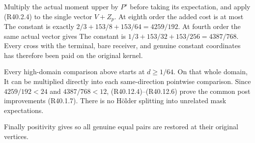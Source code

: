 Multiply the actual moment upper by \(P^s\) before taking its
expectation, and apply (R40.2.4) to the single vector \(V+Z_p\).
At eighth order the added cost is at most
The constant is exactly \(2/3+153/8+153/64=4259/192\).
At fourth order the same actual vector gives
The constant is \(1/3+153/32+153/256=4387/768\).
Every cross with the terminal, bare receiver, and genuine constant
coordinates has therefore been paid on the original kernel.

Every high-domain comparison above starts at
\(d\ge1/64\). On that whole domain,
It can be multiplied directly into each same-direction pointwise
comparison. Since \(4259/192<24\) and \(4387/768<12\), (R40.12.4)--(R40.12.6)
prove the common post improvements (R40.1.7).
There is no Hölder splitting into unrelated mask expectations.

Finally positivity gives
so all genuine equal pairs are restored at their original vertices.
